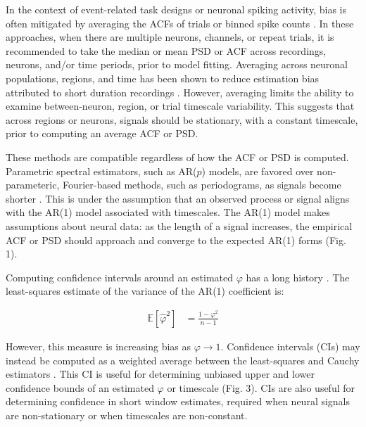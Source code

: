 \documentclass[pdflatex,sn-mathphys-num]{sn-jnl}
\begin{document}
In the context of event-related task designs or neuronal spiking activity, bias is often mitigated by averaging the ACFs of trials or binned spike counts \cite{murray_hierarchy_2014}. In these approaches, when there are multiple neurons, channels, or repeat trials, it is recommended to take the median or mean PSD or ACF across recordings, neurons, and/or time periods, prior to model fitting. Averaging across neuronal populations, regions, and time has been shown to reduce estimation bias attributed to short duration recordings \cite{spitzner_mr_2021}. However, averaging limits the ability to examine between-neuron, region, or trial timescale variability. This suggests that across regions or neurons, signals should be stationary, with a constant timescale, prior to computing an average ACF or PSD.

These methods are compatible regardless of how the ACF or PSD is computed. Parametric spectral estimators, such as AR($p$) models, are favored over non-parameteric, Fourier-based methods, such as periodograms, as signals become shorter \cite{spyers-ashby_comparison_1998}. This is under the assumption that an observed process or signal aligns with the AR(1) model associated with timescales. The AR(1) model makes assumptions about neural data: as the length of a signal increases, the empirical ACF or PSD should approach and converge to the expected AR(1) forms (Fig. 1).


Computing confidence intervals around an estimated $\varphi$ has a long history \cite{mann_statistical_1943}. The least-squares estimate of the variance of the AR(1) coefficient is:

\begin{align}
\mathbb{E}[ \hat{\varphi}^2 ] &= \frac{1 - \varphi^2}{n-1} \label{eq:var}
\end{align}

However, this measure is increasing bias as $\varphi \to 1$. Confidence intervals (CIs) may instead be computed as a weighted average between the least-squares and Cauchy estimators \cite{gallagher_small_2008}. This CI is useful for determining unbiased upper and lower confidence bounds of an estimated $\varphi$ or timescale (Fig. 3). CIs are also useful for determining confidence in short window estimates, required when neural signals are non-stationary or when timescales are non-constant.
\end{document}
